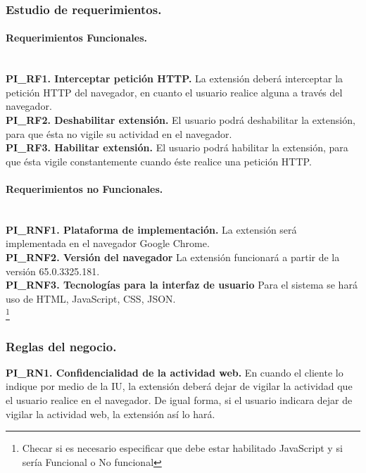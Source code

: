 \documentclass[12pt, a4paper, titlepage]{article}
\begin{document}
			\subsubsection{Estudio de requerimientos.}
				
				\paragraph{Requerimientos Funcionales.\\ \\}
				
				{\setlength{\parindent}{12pt}
				\textbf{PI\_RF1. Interceptar petición HTTP.} La extensión deberá interceptar la petición HTTP del navegador, en cuanto el usuario realice alguna a través del navegador.\\

				\textbf{PI\_RF2. Deshabilitar extensión.} El usuario podrá deshabilitar la extensión, para que ésta no vigile su actividad en el navegador.\\
				
				\textbf{PI\_RF3. Habilitar extensión.} El usuario podrá habilitar la extensión, para que ésta vigile constantemente cuando éste realice una petición HTTP.
				}
				
				\paragraph{Requerimientos no Funcionales.\\ \\}
				{\setlength{\parindent}{12pt}
				
				\textbf{PI\_RNF1. Plataforma de implementación.} La extensión será implementada en el navegador Google Chrome.\\
				
				\textbf{PI\_RNF2. Versión del navegador} La extensión funcionará a partir de la versión 65.0.3325.181.\\
				
				\textbf{PI\_RNF3. Tecnologías para la interfaz de usuario} Para el sistema se hará uso de HTML, JavaScript, CSS, JSON.\\
				\footnote{Checar si es necesario especificar que debe estar habilitado JavaScript y si sería Funcional o No funcional}
				
				}
			
			\subsubsection{Reglas del negocio.}
				{\setlength{\parindent}{12pt}
					
				\label{PI_RN1}
				\textbf{PI\_RN1. Confidencialidad de la actividad web.} En cuando el cliente lo indique por medio de la IU, la extensión deberá dejar de vigilar la actividad que el usuario realice en el navegador. De igual forma, si el usuario indicara dejar de vigilar la actividad web, la extensión así lo hará.\\
					
				}\newpage
	\newpage
\end{document}
